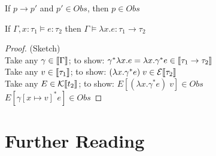 \begin{lemma}
  If $p \longrightarrow p'$ and $p' \in Obs$, then $p \in Obs$
\end{lemma}

\begin{lemma}
  If $\Gamma,x : \tau_1 \models e : \tau_2$ then $\Gamma\models \lambda x.e : \tau_1 \to \tau_2$
\end{lemma}
\begin{proof}(Sketch)\\
  Take any $\gamma \in \llbracket\Gamma\rrbracket$;
    to show: $\gamma^*\lambda x.e = \lambda x.\gamma^* e \in \llbracket\tau_1 \to \tau_2\rrbracket$\\
  Take any $v \in \llbracket\tau_1\rrbracket$;
    to show: $(\lambda x.\gamma^* e)\;v \in \mathcal{E}\llbracket\tau_2\rrbracket$\\
  Take any $E \in \mathcal{K}\llbracket t_2\rrbracket$;
    to show: $E[(\lambda x.\gamma^* e)\;v] \in Obs$\\
  $E[\gamma[x\mapsto v]^* e] \in Obs$
\end{proof}

\section{Further Reading}
